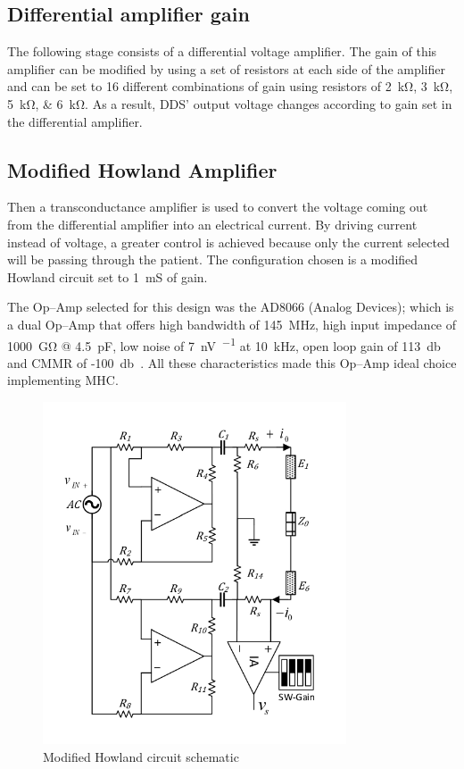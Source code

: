 \subsection{Differential amplifier gain}
The following stage consists of a differential voltage amplifier. The gain of this amplifier can be modified by using a set of resistors at each side of the amplifier and can be set to 16 different combinations of gain using resistors of \SIlist{2;3;5;6}{\kohm}. As a result, DDS’ output voltage changes according to gain set in the differential amplifier. 

\subsection{Modified Howland Amplifier}
Then a transconductance amplifier is used to convert the voltage coming out from the differential amplifier into an electrical current. By driving current instead of voltage, a greater control is achieved because only the current selected will be passing through the patient. The configuration chosen is a modified Howland circuit set to \SI{1}{\milli\siemens} of gain.
 
The Op–Amp selected for this design was the AD8066 (Analog Devices); which is a dual Op–Amp that offers high bandwidth of \SI{145}{\mega\hertz}, high input impedance of \SI{1000}{\giga\ohm} @ \SI{4.5}{\pF}, low noise of \SI{7}{\nano\volt\per{}} at \SI{10}{\kilo\hertz}, open loop gain of \SI{113}{\decibel} and CMMR of -\SI{100}{\decibel}~\cite{ad:AD8066}. All these characteristics made this Op–Amp ideal choice implementing MHC.


\begin{figure}[!htpb]
	\centering
	\includegraphics[width=9cm,keepaspectratio]{figure3}  
    \caption{Modified Howland circuit schematic}
    \label{fig:mhc}
\end{figure}

